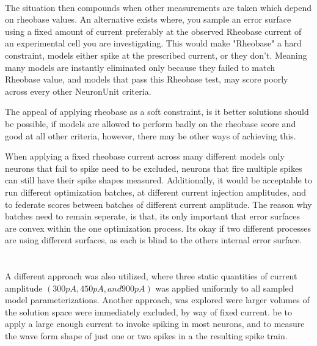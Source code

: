     \\ 
    The situation then compounds when other measurements are taken which depend on rheobase values. An alternative exists where, you sample an error surface using a fixed amount of current preferably at the observed Rheobase current of an experimental cell you are investigating. This would make "Rheobase" a hard constraint, models either spike at the prescribed current, or they don't. Meaning many models are instantly eliminated only because they failed to match Rheobase value, and models that pass this Rheobase test, may score poorly across every other NeuronUnit criteria.
    
    The appeal of applying rheobase as a soft constraint, is it better solutions should be possible, if models are allowed to perform badly on the rheobase score and good at all other criteria, however, there may be other ways of achieving this.
    
    When applying a fixed rheobase current across many different models only neurons that fail to spike need to be excluded, neurons that fire multiple spikes can still have their spike shapes measured. Additionally, it would be acceptable to run different optimization batches, at different current injection amplitudes, and to federate scores between batches of different current amplitude. The reason why batches need to remain seperate, is that, its only important that error surfaces are convex within the one optimization process. Its okay if two different processes are using different surfaces, as each is blind to the others internal error surface.\\ 
    \\
    \\
    A different approach was also utilized, where three static quantities of current amplitude $(300pA, 450pA, and 900pA)$ was applied uniformly to all sampled model parameterizations. 
    Another approach, was explored were larger volumes of the solution space were immediately excluded, by way of fixed current.
    be to apply a large enough current to invoke spiking in most neurons, and to measure the wave form shape of just one or two spikes in a the resulting spike train.
    
